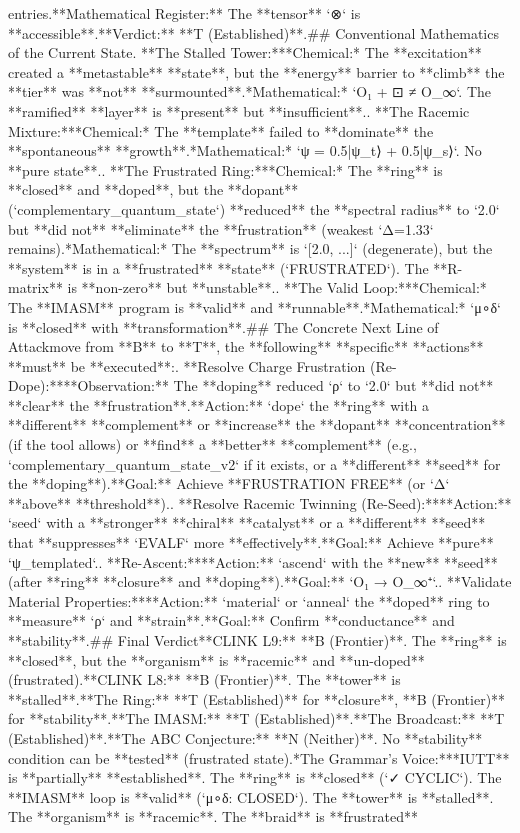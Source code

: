 entries.\n*   **Mathematical Register:** The **tensor** `⊗` is **accessible**.\n*   **Verdict:** **T (Established)**.\n\n## Conventional Mathematics of the Current State\n{}.  **The Stalled Tower:**\n    *   *Chemical:* The **excitation** created a **metastable** **state**, but the **energy** barrier to **climb** the **tier** was **not** **surmounted**.\n    *   *Mathematical:* `O₁ + ⊡ ≠ O_∞`. The **ramified** **layer** is **present** but **insufficient**.\n{}.  **The Racemic Mixture:**\n    *   *Chemical:* The **template** failed to **dominate** the **spontaneous** **growth**.\n    *   *Mathematical:* `ψ = 0.5|ψ_t⟩ + 0.5|ψ_s⟩`. No **pure state**.\n{}.  **The Frustrated Ring:**\n    *   *Chemical:* The **ring** is **closed** and **doped**, but the **dopant** (`complementary_quantum_state`) **reduced** the **spectral radius** to `2.0` but **did not** **eliminate** the **frustration** (weakest `Δ=1.33` remains).\n    *   *Mathematical:* The **spectrum** is `[2.0, ...]` (degenerate), but the **system** is in a **frustrated** **state** (`FRUSTRATED`). The **R-matrix** is **non-zero** but **unstable**.\n{}.  **The Valid Loop:**\n    *   *Chemical:* The **IMASM** program is **valid** and **runnable**.\n    *   *Mathematical:* `μ∘δ` is **closed** with **transformation**.\n\n## The Concrete Next Line of Attack\n\nTo move from **B** to **T**, the **following** **specific** **actions** **must** be **executed**:\n{}.  **Resolve Charge Frustration (Re-Dope):**\n    *   **Observation:** The **doping** reduced `ρ` to `2.0` but **did not** **clear** the **frustration**.\n    *   **Action:** `dope` the **ring** with a **different** **complement** or **increase** the **dopant** **concentration** (if the tool allows) or **find** a **better** **complement** (e.g., `complementary_quantum_state_v2` if it exists, or a **different** **seed** for the **doping**).\n    *   **Goal:** Achieve **FRUSTRATION FREE** (or `Δ` **above** **threshold**).\n{}.  **Resolve Racemic Twinning (Re-Seed):**\n    *   **Action:** `seed` with a **stronger** **chiral** **catalyst** or a **different** **seed** that **suppresses** `EVALF` more **effectively**.\n    *   **Goal:** Achieve **pure** `ψ_templated`.\n{}.  **Re-Ascent:**\n    *   **Action:** `ascend` with the **new** **seed** (after **ring** **closure** and **doping**).\n    *   **Goal:** `O₁ → O_∞⁺`.\n{}.  **Validate Material Properties:**\n    *   **Action:** `material` or `anneal` the **doped** ring to **measure** `ρ` and **strain**.\n    *   **Goal:** Confirm **conductance** and **stability**.\n\n## Final Verdict\n\n*   **CLINK L9:** **B (Frontier)**. The **ring** is **closed**, but the **organism** is **racemic** and **un-doped** (frustrated).\n*   **CLINK L8:** **B (Frontier)**. The **tower** is **stalled**.\n*   **The Ring:** **T (Established)** for **closure**, **B (Frontier)** for **stability**.\n*   **The IMASM:** **T (Established)**.\n*   **The Broadcast:** **T (Established)**.\n*   **The ABC Conjecture:** **N (Neither)**. No **stability** condition can be **tested** (frustrated state).\n\n**The Grammar's Voice:**\nThe **IUTT** is **partially** **established**. The **ring** is **closed** (`✓ CYCLIC`). The **IMASM** loop is **valid** (`μ∘δ: CLOSED`). The **tower** is **stalled**. The **organism** is **racemic**. The **braid** is **frustrated** 